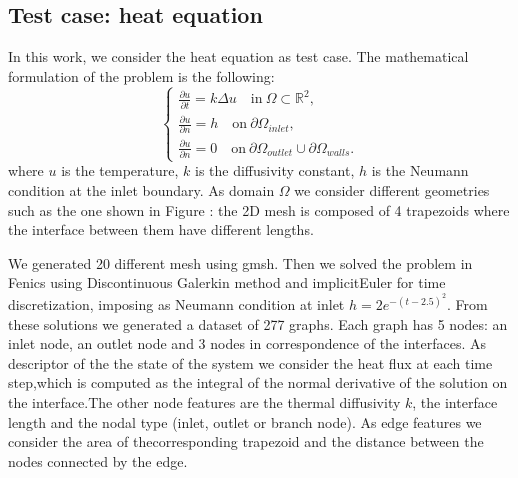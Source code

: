 \documentclass[11pt,a4paper]{article}
\begin{document}



\subsection{Test case: heat equation}
In this work, we consider the heat equation as test case. 
The mathematical formulation of the problem is the following:
\begin{equation}
    \begin{cases}
        \frac{\partial u }{\partial t} = k \Delta u \quad \text{in} \ \Omega \subset \mathbb{R}^2, \\
        \frac{\partial u}{\partial n} = h \quad \text{on} \ \partial \Omega_{inlet}, \\
        \frac{\partial u}{\partial n} = 0 \quad \text{on} \ \partial \Omega_{outlet} 
        \cup \partial \Omega_{walls}.
    \end{cases}
\end{equation}
where \(u\) is the temperature, \(k\) is the diffusivity constant, \(h\) is the Neumann condition at the inlet boundary. As domain \(\Omega\) we consider different geometries such as the one shown in Figure : the 2D mesh is composed of 4 trapezoids where the interface between them have different lengths.

We generated 20 different mesh using gmsh. 
Then we solved the problem in Fenics using Discontinuous Galerkin method and implicitEuler for time discretization, imposing as Neumann condition at inlet \(h = 2e^{-(t-2.5)^2}\).
From these solutions we generated a dataset of 277 graphs. 
Each graph has 5 nodes: an inlet node, an outlet node and 3 nodes in correspondence of the interfaces. 
As descriptor of the the state of the system we consider the heat flux at each time step,which is computed as the integral of the normal derivative of the solution on the interface.The other node features are the thermal diffusivity \(k\), the interface length and the nodal type (inlet, outlet or branch node). 
As edge features we consider the area of thecorresponding trapezoid and the distance between the nodes connected by the edge. 



\end{document}
